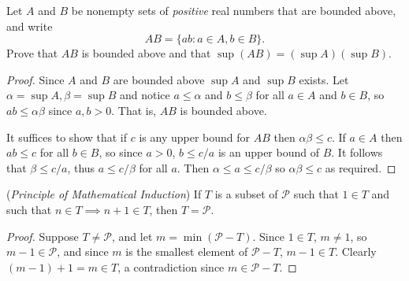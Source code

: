 \begin{tcolorbox}[title=Problem 2, breakable]
    Let $A$ and $B$ be nonempty sets of \textit{positive} real numbers that are
        bounded above, and write
    \[AB = \{ab : a \in A, b \in B\}.\]
    Prove that $AB$ is bounded above and that $\sup(AB) = (\sup A)(\sup B)$.
\end{tcolorbox}

\begin{proof}
    Since $A$ and $B$ are bounded above $\sup A$ and $\sup B$ exists.
    Let $\alpha = \sup A, \beta = \sup B$
        and notice $a \le \alpha$ and $b \le \beta$
        for all $a \in A$ and $b \in B$,
        so $ab \le \alpha\beta$ since $a, b > 0$.
    That is, $AB$ is bounded above.

    It suffices to show that if $c$ is any upper bound
    for $AB$ then $\alpha\beta \le c$.
    If $a \in A$ then $ab \le c$ for all $b \in B$,
        so since $a > 0$, $b \le c/a$ is an upper bound of $B$.
    It follows that $\beta \le c/a$, thus $a \le c/\beta$
        for all $a$.
    Then $\alpha \le a \le c/\beta$
        so $\alpha\beta \le c$ as required.
\end{proof}

\newpage
\begin{tcolorbox}[title=Problem 5, breakable]
    (\emph{Principle of Mathematical Induction}) If $T$ is a subset of $\mathcal{P}$
    such that $1 \in T$ and such that $n \in T \implies n + 1 \in T$, then $T = \mathcal{P}$.
\end{tcolorbox}

\begin{proof}
    Suppose $T \ne \mathcal{P}$,
        and let $m = \min(\mathcal{P} - T)$.
    Since $1 \in T$, $m \ne 1$, so $m - 1 \in \mathcal{P}$, and since $m$ is the
        smallest element of $\mathcal{P} - T$, $m - 1 \in T$.
    Clearly $(m - 1) + 1 = m \in T$, a contradiction
        since $m \in \mathcal{P} - T$.
\end{proof}